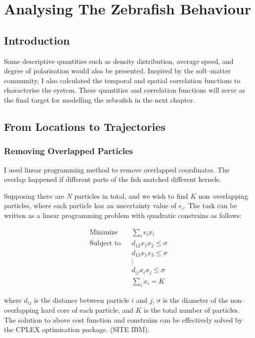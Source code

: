 \documentclass[11pt,twoside]{report}
\begin{document}
\chapter{Analysing The Zebrafish Behaviour}
\label{chapter:fish_analysis}


\section{Introduction}


Some descriptive quantities such as density distribution, average speed, and degree of polarisation would also be presented. Inspired by the soft--matter community, I also calculated the temporal and spatial correlation functions to characterise the system. These quantities and correlation functions will serve as the final target for modelling the zebrafish in the next chapter.


\section{From Locations to Trajectories}


\subsection{Removing Overlapped Particles}
\label{section:overlap}

I used linear programming method to remove overlapped coordinates. The overlap happened if different parts of the fish matched different kernels.

Supposing there are $N$ particles in total, and we wish to find $K$ non--overlapping particles, where each particle has an uncertainty value of $e_i$. The task can be written as a linear programming problem with quadratic constrains as follows:

\begin{equation}
\begin{aligned}
	\textrm{Minimize} && \sum_i{e_i x_i} \\
	\textrm{Subject to} && d_{12} x_1 x_2 \le \sigma \\
	&& d_{13} x_1 x_3 \le \sigma \\
	&& \vdots  \\
	&& d_{ij} x_i x_j \le \sigma \\
	&& \sum_i{x_i} = K
\end{aligned}
\end{equation}

\noindent where $d_{ij}$ is the distance between particle $i$ and $j$, $\sigma$ is the diameter of the non--overlapping hard core of each particle, and $K$ is the total number of particles. The solution to above cost function and constrains can be effectively solved by the CPLEX optimisation package. (SITE IBM).
\end{document}
